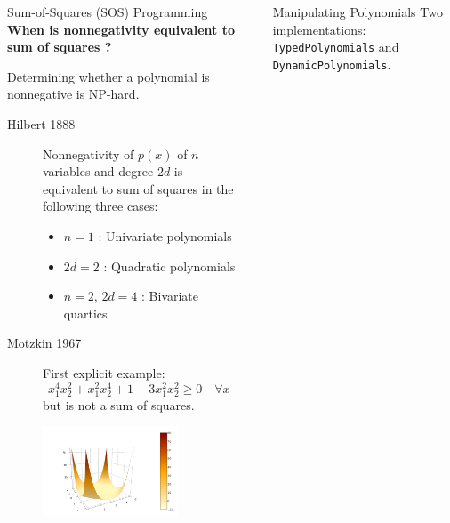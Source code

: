 \documentclass[final]{beamer}
\newlength{\sepwid}
\newlength{\onecolwid}
\begin{document}
\begin{frame}[t,fragile]
\begin{columns}[t]
\begin{column}{\onecolwid}
\begin{block}{Sum-of-Squares (SOS) Programming}
  \textbf{When is nonnegativity equivalent to sum of squares ?}

  Determining whether a polynomial is nonnegative is \alert{NP-hard}.

    \begin{description}
      \item[Hilbert 1888]
        Nonnegativity of $p(x)$ of $n$ variables and degree $2d$ is equivalent to sum of squares in the following three cases:
        \begin{itemize}
          \item $n = 1$ : Univariate polynomials
          \item $2d = 2$ : Quadratic polynomials
          \item $n = 2$, $2d = 4$ : Bivariate quartics
        \end{itemize}

      \item[Motzkin 1967]
        First explicit example:
        \[ x_1^4x_2^2 + x_1^2x_2^4 + 1 - 3x_1^2x_2^2 \geq 0 \quad \forall x \]
        but is \alert{not} a sum of squares.
        \begin{center}
          \includegraphics[trim=3cm .7cm 6cm 3cm, clip, width=0.7\textwidth]{motzkin.png}
        \end{center}
    \end{description}

  \end{block}

\end{column}

\begin{column}{\sepwid}\end{column} %

\begin{column}{\onecolwid} %
  \begin{block}{Manipulating Polynomials}
    Two implementations:
        \texttt{TypedPolynomials} and
        \texttt{DynamicPolynomials}.


\end{block}
\end{column}
\end{columns}
\end{frame}
\end{document}
